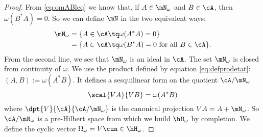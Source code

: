 \begin{proof}
	From \eqref{eq:omABleq} we know that, if $A\in\mN_{\omega}$ and $B\in\cA$, then $\omega(B^*A)=0$. So we can define $\mN$ in the two equivalent ways:
	\begin{equation}
		\begin{aligned}[]
			\mN_{\omega} & =\{ A\in\cA\tq \omega(A^*A)=0 \}                             \\
			             & =\{ A\in\cA\tq \omega(B^*A)=0\textrm{ for all $B\in\cA$} \}.
		\end{aligned}
	\end{equation}
	From the second line, we see that $\mN_{\omega}$ is an ideal in $\cA$. The set $\mN_{\omega}$ is closed from continuity of $\omega$. We use the product defined by equation \eqref{eq:defprodetat}: $(A,B):=\omega(A^*B)$. It defines a sesquilinear form on the quotient $\cA/\mN_{\omega}$
	\begin{equation}
		\scal{ VA }{VB}=\omega(A^*B)
	\end{equation}
	where $\dpt{V}{\cA}{\cA/\mN_{\omega}}$ is the canonical projection $VA=A+\mN_{\omega}$. So $\cA/\mN_{\omega}$ is a pre-Hilbert space from which we build $\hH_{\omega}$ by completion. We define the cyclic vector $\Omega_{\omega}=V\cun\in\hH_{\omega}$.


\end{proof}
